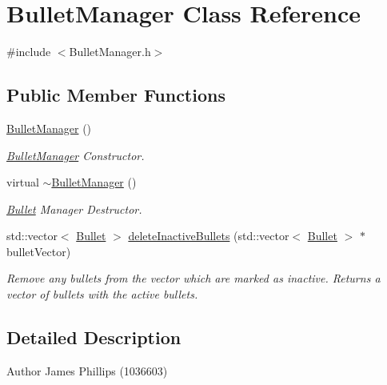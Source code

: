 \hypertarget{class_bullet_manager}{}\section{Bullet\+Manager Class Reference}
\label{class_bullet_manager}


{\ttfamily \#include $<$Bullet\+Manager.\+h$>$}

\subsection*{Public Member Functions}
\begin{DoxyCompactItemize}
\item 
\mbox{\label{class_bullet_manager_a4aae3d492898b93dd5730dc28f2cc910}} 
\hyperlink{class_bullet_manager_a4aae3d492898b93dd5730dc28f2cc910}{Bullet\+Manager} ()
\begin{DoxyCompactList}\small\item\em \hyperlink{class_bullet_manager}{Bullet\+Manager} Constructor. \end{DoxyCompactList}\item 
\mbox{\label{class_bullet_manager_ae91d473833a2b3cc9bfb6180d3eb0099}} 
virtual \hyperlink{class_bullet_manager_ae91d473833a2b3cc9bfb6180d3eb0099}{$\sim$\+Bullet\+Manager} ()
\begin{DoxyCompactList}\small\item\em \hyperlink{class_bullet}{Bullet} Manager Destructor. \end{DoxyCompactList}\item 
std\+::vector$<$ \hyperlink{class_bullet}{Bullet} $>$ \hyperlink{class_bullet_manager_a834ec287e01fc2ed7c5d3885e4b380c6}{delete\+Inactive\+Bullets} (std\+::vector$<$ \hyperlink{class_bullet}{Bullet} $>$ $\ast$bullet\+Vector)
\begin{DoxyCompactList}\small\item\em Remove any bullets from the vector which are marked as inactive. Returns a vector of bullets with the active bullets. \end{DoxyCompactList}\end{DoxyCompactItemize}


\subsection{Detailed Description}
\begin{DoxyAuthor}{Author}
James Phillips (1036603) 
\end{DoxyAuthor}


